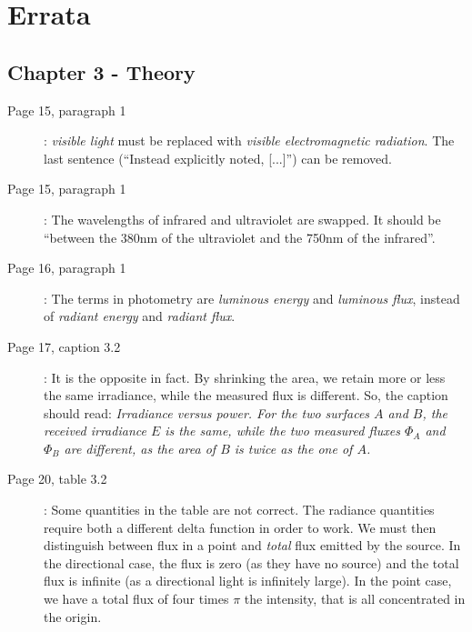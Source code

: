 \documentclass[12pt, twoside,a4paper]{article}
\begin{document}
\section{Errata}
\subsection{Chapter 3 - Theory}
\begin{description}
	\item [Page 15, paragraph 1]: \emph{visible light} must be replaced with \emph{visible electromagnetic radiation}. The last sentence (``Instead explicitly noted, [...]'') can be removed. 
	\item [Page 15, paragraph 1]: The wavelengths of infrared and ultraviolet are swapped. It should be ``between the 380nm of the ultraviolet and the 750nm of the infrared''.
	\item [Page 16, paragraph 1]: The terms in photometry are \emph{luminous energy} and \emph{luminous flux}, instead of \emph{radiant energy} and \emph{radiant flux}.
	\item [Page 17, caption 3.2]: It is the opposite in fact. By shrinking the area, we retain more or less the same irradiance, while the measured flux is different. So, the caption should read: \emph{Irradiance versus power. For the two surfaces $A$ and $B$, the received irradiance $E$ is the same, while the two measured fluxes $\Phi_A$ and $\Phi_B$ are different, as the area of $B$ is twice as the one of $A$.}
	\item [Page 20, table 3.2]: Some quantities in the table are not correct. The radiance quantities require both a different delta function in order to work. We must then distinguish between flux in a point and \emph{total} flux emitted by the source. In the directional case, the flux is zero (as they have no source) and the total flux is infinite (as a directional light is infinitely large). In the point case, we have a total flux of four times $\pi$ the intensity, that is all concentrated in the origin. 


\end{description}
\end{document}
